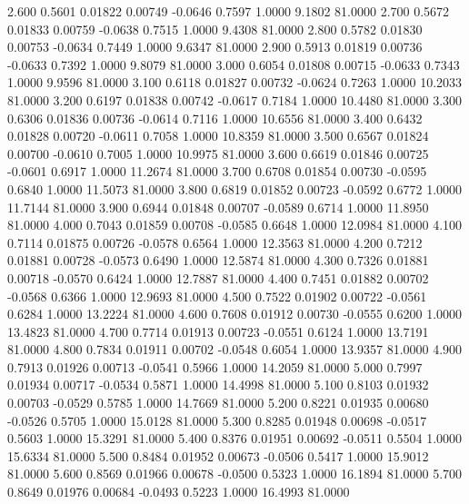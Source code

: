    2.600   0.5601   0.01822   0.00749  -0.0646   0.7597   1.0000   9.1802  81.0000
   2.700   0.5672   0.01833   0.00759  -0.0638   0.7515   1.0000   9.4308  81.0000
   2.800   0.5782   0.01830   0.00753  -0.0634   0.7449   1.0000   9.6347  81.0000
   2.900   0.5913   0.01819   0.00736  -0.0633   0.7392   1.0000   9.8079  81.0000
   3.000   0.6054   0.01808   0.00715  -0.0633   0.7343   1.0000   9.9596  81.0000
   3.100   0.6118   0.01827   0.00732  -0.0624   0.7263   1.0000  10.2033  81.0000
   3.200   0.6197   0.01838   0.00742  -0.0617   0.7184   1.0000  10.4480  81.0000
   3.300   0.6306   0.01836   0.00736  -0.0614   0.7116   1.0000  10.6556  81.0000
   3.400   0.6432   0.01828   0.00720  -0.0611   0.7058   1.0000  10.8359  81.0000
   3.500   0.6567   0.01824   0.00700  -0.0610   0.7005   1.0000  10.9975  81.0000
   3.600   0.6619   0.01846   0.00725  -0.0601   0.6917   1.0000  11.2674  81.0000
   3.700   0.6708   0.01854   0.00730  -0.0595   0.6840   1.0000  11.5073  81.0000
   3.800   0.6819   0.01852   0.00723  -0.0592   0.6772   1.0000  11.7144  81.0000
   3.900   0.6944   0.01848   0.00707  -0.0589   0.6714   1.0000  11.8950  81.0000
   4.000   0.7043   0.01859   0.00708  -0.0585   0.6648   1.0000  12.0984  81.0000
   4.100   0.7114   0.01875   0.00726  -0.0578   0.6564   1.0000  12.3563  81.0000
   4.200   0.7212   0.01881   0.00728  -0.0573   0.6490   1.0000  12.5874  81.0000
   4.300   0.7326   0.01881   0.00718  -0.0570   0.6424   1.0000  12.7887  81.0000
   4.400   0.7451   0.01882   0.00702  -0.0568   0.6366   1.0000  12.9693  81.0000
   4.500   0.7522   0.01902   0.00722  -0.0561   0.6284   1.0000  13.2224  81.0000
   4.600   0.7608   0.01912   0.00730  -0.0555   0.6200   1.0000  13.4823  81.0000
   4.700   0.7714   0.01913   0.00723  -0.0551   0.6124   1.0000  13.7191  81.0000
   4.800   0.7834   0.01911   0.00702  -0.0548   0.6054   1.0000  13.9357  81.0000
   4.900   0.7913   0.01926   0.00713  -0.0541   0.5966   1.0000  14.2059  81.0000
   5.000   0.7997   0.01934   0.00717  -0.0534   0.5871   1.0000  14.4998  81.0000
   5.100   0.8103   0.01932   0.00703  -0.0529   0.5785   1.0000  14.7669  81.0000
   5.200   0.8221   0.01935   0.00680  -0.0526   0.5705   1.0000  15.0128  81.0000
   5.300   0.8285   0.01948   0.00698  -0.0517   0.5603   1.0000  15.3291  81.0000
   5.400   0.8376   0.01951   0.00692  -0.0511   0.5504   1.0000  15.6334  81.0000
   5.500   0.8484   0.01952   0.00673  -0.0506   0.5417   1.0000  15.9012  81.0000
   5.600   0.8569   0.01966   0.00678  -0.0500   0.5323   1.0000  16.1894  81.0000
   5.700   0.8649   0.01976   0.00684  -0.0493   0.5223   1.0000  16.4993  81.0000
